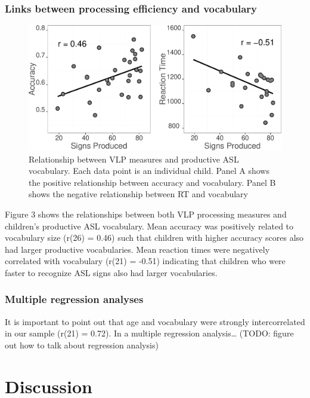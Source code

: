 \documentclass[12pt,]{article}
\begin{document}
\subsubsection{Links between processing efficiency and
vocabulary}\label{links-between-processing-efficiency-and-vocabulary}

\begin{figure}[htbp]
\centering
\includegraphics{Figs/vocab scatter plots-1.pdf}
\caption{Relationship between VLP measures and productive ASL
vocabulary. Each data point is an individual child. Panel A shows the
positive relationship between accuracy and vocabulary. Panel B shows the
negative relationship between RT and vocabulary}
\end{figure}

Figure 3 shows the relationships between both VLP processing measures
and children's productive ASL vocabulary. Mean accuracy was positively
related to vocabulary size (r(26) = 0.46) such that children with higher
accuracy scores also had larger productive vocabularies. Mean reaction
times were negatively correlated with vocabulary (r(21) = -0.51)
indicating that children who were faster to recognize ASL signs also had
larger vocabularies.

\subsubsection{Multiple regression
analyses}\label{multiple-regression-analyses}

It is important to point out that age and vocabulary were strongly
intercorrelated in our sample (r(21) = 0.72). In a multiple regression
analysis\ldots{} (TODO: figure out how to talk about regression
analysis)

\section{Discussion}\label{discussion}
\end{document}
